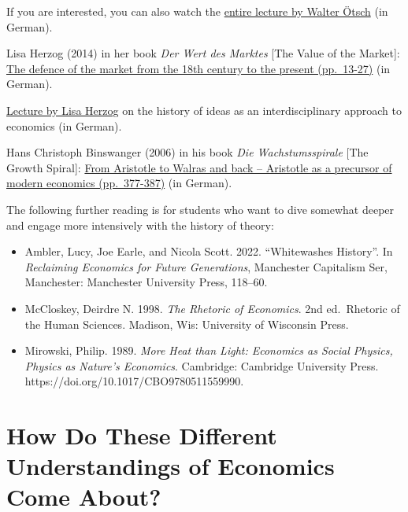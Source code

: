 \documentclass[
  british,
  a4paper,
  DIV=11,
  numbers=noendperiod,
  oneside,
  openany]{scrreprt}
\providecommand{\tightlist}{%
  \setlength{\itemsep}{0pt}\setlength{\parskip}{0pt}}
\begin{document}
\begin{tcolorbox}[enhanced jigsaw, arc=.35mm, bottomrule=.15mm, bottomtitle=1mm, breakable, colback=white, colbacktitle=quarto-callout-note-color!10!white, colframe=quarto-callout-note-color-frame, coltitle=black, left=2mm, leftrule=.75mm, opacityback=0, opacitybacktitle=0.6, rightrule=.15mm, title={Further reading}, titlerule=0mm, toprule=.15mm, toptitle=1mm]

If you are interested, you can also watch the
\href{https://www.youtube.com/watch?v=zS3QgFE5ASE}{entire lecture by
Walter Ötsch} (in German).

Lisa Herzog (2014) in her book \emph{Der Wert des Marktes} {[}The Value
of the Market{]}: \href{https://ilias.unibe.ch/go/file/3803489}{The
defence of the market from the 18th century to the present (pp.~13-27)}
(in German).

\href{https://www.youtube.com/watch?v=kgAKCvhDHIw}{Lecture by Lisa
Herzog} on the history of ideas as an interdisciplinary approach to
economics (in German).

Hans Christoph Binswanger (2006) in his book \emph{Die Wachstumsspirale}
{[}The Growth Spiral{]}:
\href{https://ilias.unibe.ch/go/file/3803487}{From Aristotle to Walras
and back -- Aristotle as a precursor of modern economics (pp.~377-387)}
(in German).

The following further reading is for students who want to dive somewhat
deeper and engage more intensively with the history of theory:

\begin{itemize}
\tightlist
\item
  Ambler, Lucy, Joe Earle, and Nicola Scott. 2022. ``Whitewashes
  History''. In \emph{Reclaiming Economics for Future Generations},
  Manchester Capitalism Ser, Manchester: Manchester University Press,
  118--60.
\item
  McCloskey, Deirdre N. 1998. \emph{The Rhetoric of Economics}. 2nd
  ed.~Rhetoric of the Human Sciences. Madison, Wis: University of
  Wisconsin Press.
\item
  Mirowski, Philip. 1989. \emph{More Heat than Light: Economics as
  Social Physics, Physics as Nature's Economics}. Cambridge: Cambridge
  University Press. https://doi.org/10.1017/CBO9780511559990.
\end{itemize}

\end{tcolorbox}

\section{How Do These Different Understandings of Economics Come
About?}\label{how-do-these-different-understandings-of-economics-come-about}
\end{document}
